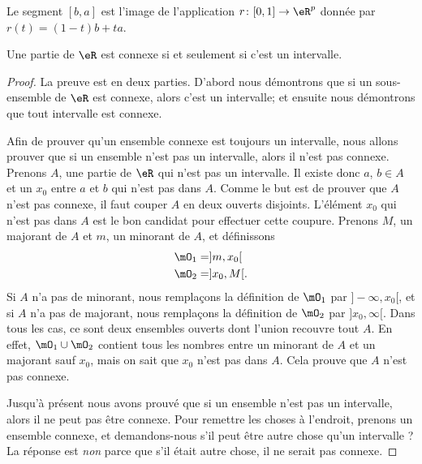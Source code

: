 Le segment $[b,a]$ est l'image de l'application $r\colon [0,1]\to \eR^p$ donnée par $r(t)=(1-t)b+ta$.

\begin{proposition} \label{PropInterssiConn}
    Une partie de $\eR$ est connexe si et seulement si c'est un intervalle.
\end{proposition}

\begin{proof}
    La preuve est en deux parties. D'abord nous démontrons que si un sous-ensemble de $\eR$ est connexe, alors c'est un intervalle; et ensuite nous démontrons que tout intervalle est connexe.

    Afin de prouver qu'un ensemble connexe est toujours un intervalle, nous allons prouver que si un ensemble n'est pas un intervalle, alors il n'est pas connexe. Prenons $A$, une partie de $\eR$ qui n'est pas un intervalle. Il existe donc $a$, $b\in A$ et un $x_0$ entre $a$ et $b$ qui n'est pas dans $A$. Comme le but est de prouver que $A$ n'est pas connexe, il faut couper $A$ en deux ouverts disjoints. L'élément $x_0$ qui n'est pas dans $A$ est le bon candidat pour effectuer cette coupure. Prenons $M$, un majorant de $A$ et $m$, un minorant de $A$, et définissons
    \begin{align*}
        \mO_1&=]m,x_0[\\
        \mO_2&=]x_0,M[.
    \end{align*}
    Si $A$ n'a pas de minorant, nous remplaçons la définition de $\mO_1$ par $]-\infty,x_0[$, et si $A$ n'a pas de majorant, nous remplaçons la définition de $\mO_2$ par $]x_0,\infty[$. Dans tous les cas, ce sont deux ensembles ouverts dont l'union recouvre tout $A$. En effet, $\mO_1\cup \mO_2$ contient tous les nombres entre un minorant de $A$ et un majorant sauf $x_0$, mais on sait que $x_0$ n'est pas dans $A$. Cela prouve que $A$ n'est pas connexe.

    Jusqu'à présent nous avons prouvé que si un ensemble n'est pas un intervalle, alors il ne peut pas être connexe. Pour remettre les choses à l'endroit, prenons un ensemble connexe, et demandons-nous s'il peut être autre chose qu'un intervalle ? La réponse est \emph{non} parce que s'il était autre chose, il ne serait pas connexe.


\end{proof}
